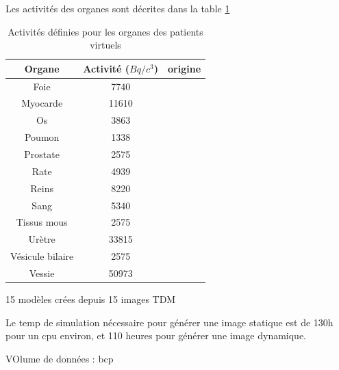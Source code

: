 Les activités des organes sont décrites dans la table \ref{tab:contrastePoumonFoieRecap}
\begin{table}
\centering
 \begin{tabular}{|c|c|c|} 
\hline
Organe 		& Activité ($Bq/c^3$) & origine\\
\hline
\hline
Foie		& 7740		      & \\
\hline
Myocarde	& 11610		      & \\
\hline
Os		& 3863		      & \\
\hline
Poumon 		& 1338 		      & \\
\hline
Prostate	& 2575		      & \\
\hline
Rate		& 4939		      & \\
\hline
Reins		& 8220		      & \\
\hline
Sang		& 5340		      & \\
\hline
Tissus mous 	& 2575 		      & \\
\hline
Urètre		& 33815		      & \\
\hline
Vésicule bilaire& 2575		      & \\
\hline
Vessie		& 50973		      & \\
\hline
 \end{tabular}

\caption[Activités des organes des patients de la base de donnée]{Activités définies pour les organes des patients virtuels}
\label{tab:contrastePoumonFoieRecap}
\end{table}

15 modèles crées depuis 15 images TDM

Le temp de simulation nécessaire pour générer une image statique est de 130h pour un cpu environ, et 110 heures pour générer une image dynamique.

VOlume de données : bcp
